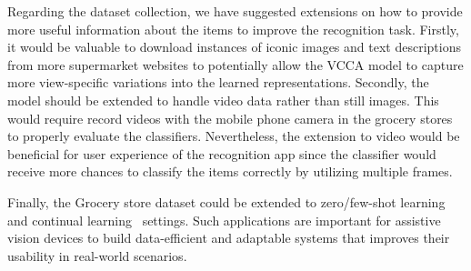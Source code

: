 
Regarding the dataset collection, we have suggested extensions on how to provide more useful information about the items to improve the recognition task. Firstly, it would be valuable to download instances of iconic images and text descriptions from more supermarket websites to potentially allow the VCCA model to capture more view-specific variations into the learned representations. Secondly, the model should be extended to handle video data rather than still images. This would require record videos with the mobile phone camera in the grocery stores to properly evaluate the classifiers. Nevertheless, the extension to video would be beneficial for user experience of the recognition app since the classifier would receive more chances to classify the items correctly by utilizing multiple frames. 

Finally, the Grocery store dataset could be extended to zero/few-shot learning~\cite{xian2018zero, wang2020generalizing} and continual learning~\cite{delange2021continual, parisi2019continual} settings. Such applications are important for assistive vision devices to build data-efficient and adaptable systems that improves their usability in real-world scenarios. 




